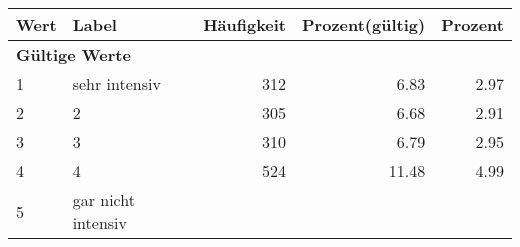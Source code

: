      \begin{longtable}{lXrrr}
     \toprule
     \textbf{Wert} & \textbf{Label} & \textbf{Häufigkeit} & \textbf{Prozent(gültig)} & \textbf{Prozent} \\
     \endhead
     \midrule
     \multicolumn{5}{l}{\textbf{Gültige Werte}}\\

     1 &
     \multicolumn{1}{X}{ sehr intensiv   } &


       \num{312} &
       \num[round-mode=places,round-precision=2]{6.83} &
         \num[round-mode=places,round-precision=2]{2.97} \\

     2 &
     \multicolumn{1}{X}{ 2   } &


       \num{305} &
       \num[round-mode=places,round-precision=2]{6.68} &
         \num[round-mode=places,round-precision=2]{2.91} \\

     3 &
     \multicolumn{1}{X}{ 3   } &


       \num{310} &
       \num[round-mode=places,round-precision=2]{6.79} &
         \num[round-mode=places,round-precision=2]{2.95} \\

     4 &
     \multicolumn{1}{X}{ 4   } &


       \num{524} &
       \num[round-mode=places,round-precision=2]{11.48} &
         \num[round-mode=places,round-precision=2]{4.99} \\

     5 &
     \multicolumn{1}{X}{ gar nicht intensiv   } &



\end{longtable}
